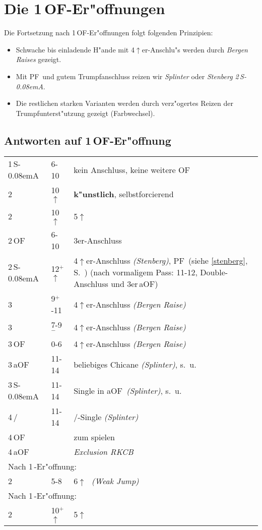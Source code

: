 \documentclass[11pt,german,twocolumn]{scrartcl}
\renewcommand{\Cl}{{\color{ClColor}{$\clubsuit$}}}
\renewcommand{\Di}{{\color{DiColor}{$\vardiamondsuit$}}}
\renewcommand{\He}{{\color{HeColor}{$\varheartsuit$}}}
\renewcommand{\Sp}{{\color{SpColor}{$\spadesuit$}}}
\def\pik{\,\Sp}
\def\coe{\,\He}
\def\kar{\,\Di}
\def\tre{\,\Cl}
\def\ka{\Di}
\def\tr{\Cl}
\def\good{$^+$}
\def\bad{$^-$}
\def\pl{$\uparrow$}
\def\of{\textsf{\,OF}}
\def\ofa{\textsf{OF}}
\def\aof{\textsf{\,aOF}}
\def\aofa{\textsf{aOF}}
\def\SA{\textsf{\,S\kern-0.08emA}}
\newcommand{\conv}[1]{\emph{#1}}
\def\pf{\textsc{PF}}
\newcommand\bidins[1]%
{%
\begin{flushleft}
\begin{tabularx}{\columnwidth}{llX}%
#1
\end{tabularx}%
\end{flushleft}
}
\begin{document}
\section{Die 1\of-Er"offnungen}

Die Fortsetzung nach 1\of-Er"offnungen folgt folgenden Prinzipien:
\begin{itemize}
\setlength{\itemsep}{0.5ex}
\item Schwache bis einladende H"ande mit 4\pl{}er-Anschlu"s werden durch
  \conv{Bergen Raises} gezeigt.
\item Mit \pf\ und gutem Trumpfanschluss reizen wir
  \conv{Splinter} oder \conv{Stenberg 2\SA}.
\item Die restlichen starken Varianten werden durch verz"ogertes
  Reizen der Trumpfunterst"utzung gezeigt (Farbwechsel).
\end{itemize}

\subsection{Antworten auf 1\of-Er"offnung}

\bidins{%
  1\SA & 6-10 & kein Anschluss, keine weitere \ofa\\[1ex]
  2\tre & 10\pl & \textbf{k"unstlich}, selbstforcierend\\[1ex]
  2\kar & 10\pl & 5\pl\kar\\[1ex]
  2\of & 6-10 & 3er-Anschluss\\[1ex]
  2\SA & 12\good\pl & 4\pl{}er-Anschluss \conv{(Stenberg)}, \pf\ (siehe
    \ref{stenberg}, S.~\pageref{stenberg})
    (nach vormaligem Pass: 11-12, Double-Anschluss und 3er\aof)\\[1ex]
  3\tre & 9\good-11 & 4\pl{}er-Anschluss \conv{(Bergen Raise)}\\
  3\kar & 7-9\bad & 4\pl{}er-Anschluss \conv{(Bergen Raise)}\\
  3\of & 0-6 & 4\pl{}er-Anschluss \conv{(Bergen Raise)}\\[1ex]
  3\aof & 11-14 & beliebiges Chicane \conv{(Splinter)}, s.~u.\\
  3\SA & 11-14 & Single in \aofa\ \conv{(Splinter)}, s.~u.\\
  4\tre/\ka & 11-14 & \tr/\ka-Single \conv{(Splinter)}\\[1ex]
  4\of && zum spielen\\[1ex]
  4\aof && \conv{Exclusion RKCB}\\[3ex]
  \multicolumn{3}{l}{Nach 1\coe-Er"offnung:}\\[1ex]
  2\pik & 5-8 & 6\pl\pik\ \conv{(Weak Jump)}\\[2ex]
  \multicolumn{3}{l}{Nach 1\pik-Er"offnung:}\\[1ex]
  2\coe & 10\good\pl & 5\pl\coe
}
\end{document}
